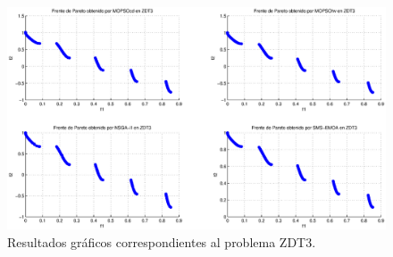 \clearpage
\newpage
\begin{figure}
      \begin{center}
	  \includegraphics[scale=0.45]{Cap4/rzdt3r.eps}
      \end{center}
	\caption{Resultados gr\'aficos correspondientes al problema ZDT3.}
      \label{fig:rZDT3}
      \end{figure}
\clearpage
\newpage
